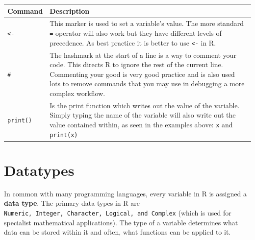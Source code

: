 \documentclass[a4paper]{book}
\begin{document}
\begin{longtable}[]{@{}ll@{}}
\toprule
\begin{minipage}[b]{0.13\columnwidth}\raggedright\strut
Command\strut
\end{minipage} & \begin{minipage}[b]{0.81\columnwidth}\raggedright\strut
Description\strut
\end{minipage}\tabularnewline
\midrule
\endhead
\begin{minipage}[t]{0.13\columnwidth}\raggedright\strut
\texttt{\textless{}-}\strut
\end{minipage} & \begin{minipage}[t]{0.81\columnwidth}\raggedright\strut
This marker is used to set a variable's value. The more standard
\texttt{=} operator will also work but they have different levels of
precedence. As best practice it is better to use \texttt{\textless{}-}
in R.\strut
\end{minipage}\tabularnewline
\begin{minipage}[t]{0.13\columnwidth}\raggedright\strut
\texttt{\#}\strut
\end{minipage} & \begin{minipage}[t]{0.81\columnwidth}\raggedright\strut
The hashmark at the start of a line is a way to comment your code. This
directs R to ignore the rest of the current line. Commenting your good
is very good practice and is also used lots to remove commands that you
may use in debugging a more complex workflow.\strut
\end{minipage}\tabularnewline
\begin{minipage}[t]{0.13\columnwidth}\raggedright\strut
\texttt{print()}\strut
\end{minipage} & \begin{minipage}[t]{0.81\columnwidth}\raggedright\strut
Is the print function which writes out the value of the variable. Simply
typing the name of the variable will also write out the value contained
within, as seen in the examples above: \texttt{x} and
\texttt{print(x)}\strut
\end{minipage}\tabularnewline
\bottomrule
\end{longtable}

\section{Datatypes}\label{datatypes}

In common with many programming languages, every variable in R is
assigned a \textbf{data type}. The primary data types in R are
\texttt{Numeric,\ Integer,\ Character,\ Logical,\ and\ Complex} (which
is used for specialist mathematical applications). The type of a
variable determines what data can be stored within it and often, what
functions can be applied to it.
\end{document}

